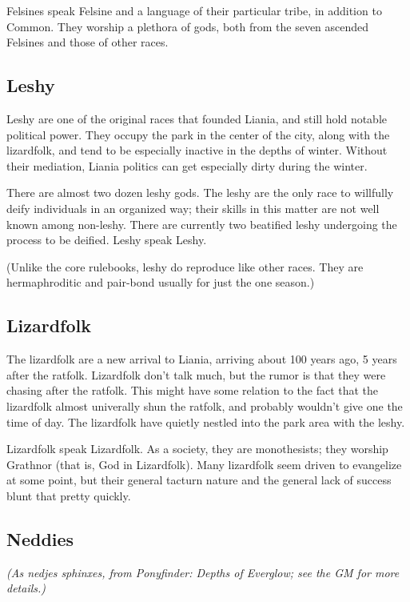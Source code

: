 \documentclass{report}
\begin{document}
Felsines speak Felsine and a language of their particular tribe, in addition to
Common. They worship a plethora of gods, both from the seven ascended Felsines
and those of other races.

\subsection{Leshy}

Leshy are one of the original races that founded Liania, and still hold notable
political power. They occupy the park in the center of the city, along with the
lizardfolk, and tend to be especially inactive in the depths of winter. Without
their mediation, Liania politics can get especially dirty during the winter.

There are almost two dozen leshy gods. The leshy are the only race to willfully
deify individuals in an organized way; their skills in this matter are not well
known among non-leshy. There are currently two beatified leshy undergoing the
process to be deified. Leshy speak Leshy.

(Unlike the core rulebooks, leshy do reproduce like other races. They are
hermaphroditic and pair-bond usually for just the one season.)

\subsection{Lizardfolk}

The lizardfolk are a new arrival to Liania, arriving about 100 years ago, 5
years after the ratfolk. Lizardfolk don't talk much, but the rumor is that
they were chasing after the ratfolk. This might have some relation to the fact
that the lizardfolk almost univerally shun the ratfolk, and probably wouldn't
give one the time of day. The lizardfolk have quietly nestled into the park area
with the leshy.

Lizardfolk speak Lizardfolk. As a society, they are monothesists; they worship
Grathnor (that is, God in Lizardfolk). Many lizardfolk seem driven to evangelize
at some point, but their general tacturn nature and the general lack of success
blunt that pretty quickly.

\subsection{Neddies}

\emph{(As nedjes sphinxes, from \emph{Pony\-finder: Depths of Everglow}; see the GM for more details.)}
\end{document}
